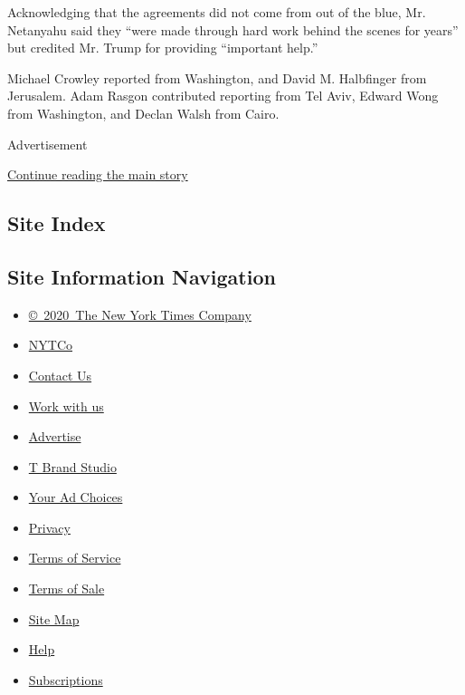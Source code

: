 Acknowledging that the agreements did not come from out of the blue, Mr.
Netanyahu said they ``were made through hard work behind the scenes for
years'' but credited Mr. Trump for providing ``important help.''

Michael Crowley reported from Washington, and David M. Halbfinger from
Jerusalem. Adam Rasgon contributed reporting from Tel Aviv, Edward Wong
from Washington, and Declan Walsh from Cairo.

Advertisement

\protect\hyperlink{after-bottom}{Continue reading the main story}

\hypertarget{site-index}{%
\subsection{Site Index}\label{site-index}}

\hypertarget{site-information-navigation}{%
\subsection{Site Information
Navigation}\label{site-information-navigation}}

\begin{itemize}
\tightlist
\item
  \href{https://help.nytimes3xbfgragh.onion/hc/en-us/articles/115014792127-Copyright-notice}{©~2020~The
  New York Times Company}
\end{itemize}

\begin{itemize}
\tightlist
\item
  \href{https://www.nytco.com/}{NYTCo}
\item
  \href{https://help.nytimes3xbfgragh.onion/hc/en-us/articles/115015385887-Contact-Us}{Contact
  Us}
\item
  \href{https://www.nytco.com/careers/}{Work with us}
\item
  \href{https://nytmediakit.com/}{Advertise}
\item
  \href{http://www.tbrandstudio.com/}{T Brand Studio}
\item
  \href{https://www.nytimes3xbfgragh.onion/privacy/cookie-policy\#how-do-i-manage-trackers}{Your
  Ad Choices}
\item
  \href{https://www.nytimes3xbfgragh.onion/privacy}{Privacy}
\item
  \href{https://help.nytimes3xbfgragh.onion/hc/en-us/articles/115014893428-Terms-of-service}{Terms
  of Service}
\item
  \href{https://help.nytimes3xbfgragh.onion/hc/en-us/articles/115014893968-Terms-of-sale}{Terms
  of Sale}
\item
  \href{https://spiderbites.nytimes3xbfgragh.onion}{Site Map}
\item
  \href{https://help.nytimes3xbfgragh.onion/hc/en-us}{Help}
\item
  \href{https://www.nytimes3xbfgragh.onion/subscription?campaignId=37WXW}{Subscriptions}
\end{itemize}
